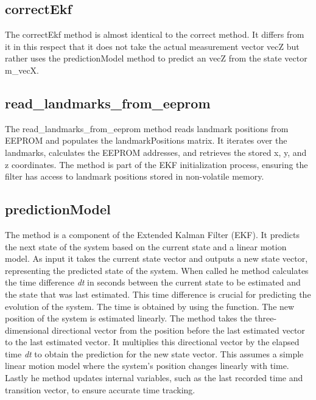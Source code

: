 \subsection{correctEkf}
\label{sub:correctEkf}
The correctEkf method is almost identical to the correct method. 
It differs from it in this respect that it does not take the actual measurement vector vecZ but rather uses the predictionModel method to predict an vecZ from the state vector m\_vecX. 

\subsection{read\_landmarks\_from\_eeprom}
\label{sub:read_landmarks_from_eeprom}
The read\_landmarks\_from\_eeprom method reads landmark positions from EEPROM and populates the landmarkPositions matrix. It iterates over the landmarks, calculates the EEPROM addresses, and retrieves the stored x, y, and z coordinates. 
The method is part of the EKF initialization process, ensuring the filter has access to landmark positions stored in non-volatile memory.

\subsection{predictionModel}
\label{sub:predictionModel}
The  method is a component of the Extended Kalman Filter (EKF). It predicts the next state of the system based on the current state and a linear motion model. 
As input it takes the current state vector and outputs a new state vector, representing the predicted state of the system. 
\vspace{4pt}
\newline
When called he method calculates the time difference \textit{dt} in seconds between the current state to be estimated and the state that was last estimated. This time difference is crucial for predicting the evolution of the system. 
The time is obtained by using the  function. 
\vspace{4pt}
\newline
The new position of the system is estimated linearly. The method takes the three-dimensional directional vector from the position before the last estimated vector to the last estimated vector. It multiplies this directional vector by the elapsed time \textit{dt} to obtain the prediction for the new state vector. 
This assumes a simple linear motion model where the system's position changes linearly with time.
\vspace{4pt}
\newline
Lastly he method updates internal variables, such as the last recorded time and transition vector, to ensure accurate time tracking.

